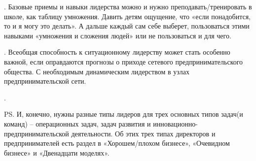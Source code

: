 .
Базовые приемы и навыки лидерства можно и нужно преподавать/тренировать в
школе, как таблицу умножения. Давить детям ощущение, что «если понадобится, то
и я могу это делать». А дальше каждый сам себе выберет, пользоваться этими
навыками «умножения и сложения людей» или не пользоваться и для чего. 

.
Всеобщая способность к ситуационному лидерству может стать особенно важной,
если оправдаются прогнозы о приходе сетевого предпринимательского общества. С
необходимым динамическим лидерством в узлах предпринимательской сети. 

.

PS. И, конечно, нужны разные типы лидеров для трех основных типов задач(и
команд) – операционных задач, задач развития и инновационно-предпринимательской
деятельности. Об этих трех типах директоров и предпринимателей есть раздел в
«Хорошем/плохом бизнесе», «Очевидном бизнесе» и «Двенадцати моделях».

